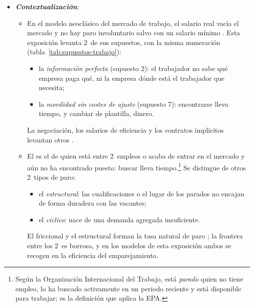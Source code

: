 \documentclass[11pt]{article}
\begin{document}
\begin{itemize}
\item \textbf{\emph{Contextualización}}:
  \begin{itemize}
  \item En el modelo neoclásico del mercado de trabajo, el salario real vacía el mercado y no hay paro involuntario salvo con un salario mínimo . Esta exposición levanta 2~de sus supuestos, con la misma numeración (tabla~\ref{tab:supuestos-trabajo}):
    \begin{itemize}
    \item la \emph{información perfecta} (supuesto 2): el trabajador no sabe qué empresa paga qué, ni la empresa dónde está el trabajador que necesita;
    \item la \emph{movilidad sin costes de ajuste} (supuesto 7): encontrarse lleva tiempo, y cambiar de plantilla, dinero.
    \end{itemize}
    La negociación, los salarios de eficiencia y los contratos implícitos levantan otros .
  \item El  es el de quien está entre 2~empleos o acaba de entrar en el mercado y aún no ha encontrado puesto: buscar lleva tiempo.\footnote{Según la Organización Internacional del Trabajo, está \emph{parado} quien no tiene empleo, lo ha buscado activamente en un periodo reciente y está disponible para trabajar\nocite{OIT2013Resolucion}; es la definición que aplica la EPA\nocite{INE2026EPA3T}.} Se distingue de otros 2~tipos de paro:
    \begin{itemize}
    \item el \emph{estructural}: las cualificaciones o el lugar de los parados no encajan de forma duradera con las vacantes;
    \item el \emph{cíclico}: nace de una demanda agregada insuficiente.
    \end{itemize}
    El friccional y el estructural forman la tasa natural de paro ; la frontera entre los 2~es borrosa, y en los modelos de esta exposición ambos se recogen en la eficiencia del emparejamiento.

\end{itemize}
\end{itemize}
\end{document}
